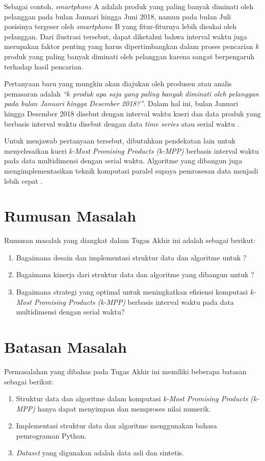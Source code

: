 Sebagai contoh, \textit{smartphone} A adalah produk yang paling banyak diminati oleh pelanggan pada bulan Januari hingga Juni 2018, namun pada bulan Juli posisinya tergeser oleh \textit{smartphone} B yang fitur-fiturnya lebih disukai oleh pelanggan. Dari ilustrasi tersebut, dapat diketahui bahwa interval waktu juga merupakan faktor penting yang harus dipertimbangkan dalam proses pencarian $k$ produk yang paling banyak diminati oleh pelanggan karena sangat berpengaruh terhadap hasil pencarian.

Pertanyaan baru yang mungkin akan diajukan oleh produsen atau analis
pemasaran adalah \textit{“$k$ produk apa saja yang paling banyak diminati oleh pelanggan pada bulan Januari hingga Desember 2018?”}. Dalam hal ini, bulan Januari hingga Desember 2018 disebut dengan interval waktu kueri dan data produk yang berbasis interval waktu disebut dengan data \textit{time series} atau serial waktu \cite{time-series}.

Untuk menjawab pertanyaan tersebut, dibutuhkan pendekatan lain untuk menyelesaikan kueri \textit{k-Most Promising Products (k-MPP)} berbasis interval waktu pada data multidimensi dengan serial waktu. Algoritme yang dibangun juga mengimplementasikan teknik komputasi paralel supaya pemrosesan data menjadi lebih cepat \cite{kmpp}.

\section{Rumusan Masalah}
\tab Rumusan masalah yang diangkat dalam Tugas Akhir ini adalah sebagai berikut:
\begin{enumerate}
	\item Bagaimana desain dan implementasi struktur data dan algoritme untuk \problem?
	\item Bagaimana kinerja dari struktur data dan algoritme yang dibangun untuk \problem?
	\item Bagaimana strategi yang optimal untuk meningkatkan efisiensi komputasi \textit{k-Most Promising Products (k-MPP)} berbasis interval waktu pada data multidimensi dengan serial waktu?
\end{enumerate}

\section{Batasan Masalah}
\tab Permasalahan yang dibahas pada Tugas Akhir ini memiliki beberapa batasan sebagai berikut:
\begin{enumerate}
	\item Struktur data dan algoritme dalam komputasi \textit{k-Most Promising Products (k-MPP)} hanya dapat menyimpan dan memproses nilai numerik.
	\item Implementasi struktur data dan algoritme menggunakan bahasa pemrograman Python.
	\item \textit{Dataset} yang digunakan adalah data asli dan sintetis.
\end{enumerate}

